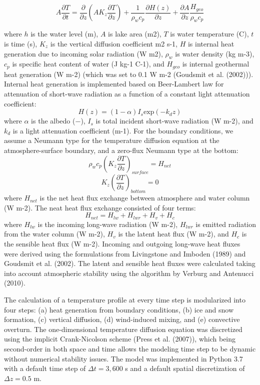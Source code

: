 \documentclass[
  letterpaper,
  DIV=11,
  numbers=noendperiod]{scrartcl}
\begin{document}
\[
    A \frac{\partial T}{\partial t}=\frac{\partial}{\partial z}(A K_z \frac{\partial T}{\partial z}) + \frac{1}{{\rho_w c_p}}\frac{\partial H(z)}{\partial z}  + \frac{\partial A}{\partial z}\frac{H_{geo}}{\rho_w c_p}
\]

where \(h\) is the water level (m), \(A\) is lake area (m2), \(T\) is
water temperature (\textdegree C), \(t\) is time (s), \(K_z\) is the
vertical diffusion coefficient m2 s-1, \(H\) is internal heat generation
due to incoming solar radiation (W m2), \(\rho_w\) is water density (kg
m-3), \(c_p\) is specific heat content of water (J kg-1
\textdegree C-1), and \(H_{geo}\) is internal geothermal heat generation
(W m-2) (which was set to 0.1 W m-2 (Goudsmit et al. (2002))). Internal
heat generation is implemented based on Beer-Lambert law for attenuation
of short-wave radiation as a function of a constant light attenuation
coefficient: \[
    H(z)=\left(1-\alpha\right)I_s \text{exp}\left(-k_d z\right)
\] where \(\alpha\) is the albedo (\(-\)), \(I_s\) is total incident
short-wave radiation (W m-2), and \(k_d\) is a light attenuation
coefficient (m-1). For the boundary conditions, we assume a Neumann type
for the temperature diffusion equation at the atmosphere-surface
boundary, and a zero-flux Neumann type at the bottom: \[
    \rho_w c_p(K_z \frac{\partial T}{\partial z})_{surface}=H_{net}
\] \[
    K_z (\frac{\partial T}{\partial z})_{bottom}=0
\] where \(H_{net}\) is the net heat flux exchange between atmosphere
and water column (W m-2). The neat heat flux exchange consisted of four
terms: \[
    H_{net}=H_{lw}+H_{lwr}+H_v+H_c
\] where \(H_{lw}\) is the incoming long-wave radiation (W m-2),
\(H_{lwr}\) is emitted radiation from the water column (W m-2), \(H_v\)
is the latent heat flux (W m-2), and \(H_c\) is the sensible heat flux
(W m-2). Incoming and outgoing long-wave heat fluxes were derived using
the formulations from Livingstone and Imboden (1989) and Goudsmit et al.
(2002). The latent and sensible heat fluxes were calculated taking into
account atmospheric stability using the algorithm by Verburg and
Antenucci (2010).

The calculation of a temperature profile at every time step is
modularized into four steps: (a) heat generation from boundary
conditions, (b) ice and snow formation, (c) vertical diffusion, (d)
wind-induced mixing, and (e) convective overturn. The one-dimensional
temperature diffusion equation was discretized using the implicit
Crank-Nicolson scheme (Press et al. (2007)), which being second-order in
both space and time allows the modeling time step to be dynamic without
numerical stability issues. The model was implemented in Python 3.7 with
a default time step of \(\Delta t = 3,600\) s and a default spatial
discretization of \(\Delta z = 0.5\) m.
\end{document}
